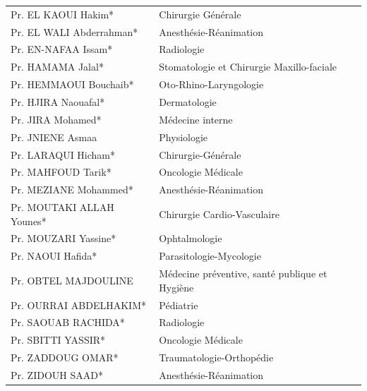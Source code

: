 \begin{table}[H]
\begin{tabular}{l l}
    Pr. EL KAOUI Hakim* & Chirurgie Générale \\
    Pr. EL WALI Abderrahman* & Anesthésie-Réanimation \\
    Pr. EN-NAFAA Issam* & Radiologie \\
    Pr. HAMAMA Jalal* & Stomatologie et Chirurgie Maxillo-faciale \\
    Pr. HEMMAOUI Bouchaib* & Oto-Rhino-Laryngologie \\
    Pr. HJIRA Naouafal* & Dermatologie \\
    Pr. JIRA Mohamed* & Médecine interne \\
    Pr. JNIENE Asmaa & Physiologie \\
    Pr. LARAQUI Hicham* & Chirurgie-Générale \\
    Pr. MAHFOUD Tarik* & Oncologie Médicale \\
    Pr. MEZIANE Mohammed* & Anesthésie-Réanimation \\
    Pr. MOUTAKI ALLAH Younes* & Chirurgie Cardio-Vasculaire \\
    Pr. MOUZARI Yassine* & Ophtalmologie \\
    Pr. NAOUI Hafida* & Parasitologie-Mycologie \\
    Pr. OBTEL MAJDOULINE & Médecine préventive, santé publique et Hygiène \\
    Pr. OURRAI ABDELHAKIM* & Pédiatrie \\
    Pr. SAOUAB RACHIDA* & Radiologie \\
    Pr. SBITTI YASSIR* & Oncologie Médicale \\
    Pr. ZADDOUG OMAR* & Traumatologie-Orthopédie \\
    Pr. ZIDOUH SAAD* & Anesthésie-Réanimation \\
  \end{tabular}
\end{table}


